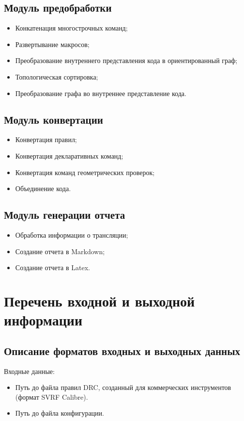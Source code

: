 \subsection{Модуль предобработки}
\begin{itemize}
	\item Конкатенация многострочных команд;
	\item Развертывание макросов;
	\item Преобразование внутреннего представления кода в ориентированный граф;
	\item Топологическая сортировка;
	\item Преобразование графа во внутреннее представление кода.
\end{itemize}

\subsection{Модуль конвертации}
\begin{itemize}
	\item Конвертация правил;
	\item Конвертация декларативных команд;
	\item Конвертация команд геометрических проверок;
	\item Объединение кода.
\end{itemize}

\subsection{Модуль генерации отчета}
\begin{itemize}
	\item Обработка информации о трансляции;
	\item Создание отчета в Markdown;
	\item Создание отчета в Latex.
\end{itemize}


\section{Перечень входной и выходной информации}

\subsection{Описание форматов входных и выходных данных}

Входные данные:

\begin{itemize}
	\item Путь до файла правил DRC,
		созданный для коммерческих инструментов (формат SVRF Calibre).
	\item Путь до файла конфигурации.
\end{itemize}

